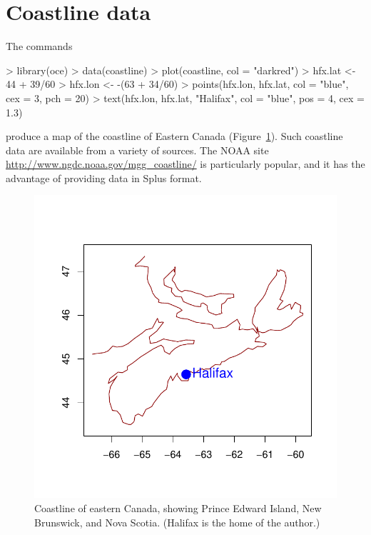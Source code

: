 \documentclass{article}
\begin{document}
\section{Coastline data}
The commands
\begin{Schunk}
\begin{Sinput}
> library(oce)
> data(coastline)
> plot(coastline, col = "darkred")
> hfx.lat <- 44 + 39/60
> hfx.lon <- -(63 + 34/60)
> points(hfx.lon, hfx.lat, col = "blue", cex = 3, pch = 20)
> text(hfx.lon, hfx.lat, "Halifax", col = "blue", pos = 4, cex = 1.3)
\end{Sinput}
\end{Schunk}
produce a map of the coastline of Eastern Canada (Figure~\ref{fig:coastline}). Such coastline
data are available from a variety of sources. The NOAA site
\url{http://www.ngdc.noaa.gov/mgg_coastline/}
is particularly popular, and it has the advantage
of providing data in Splus format.
\begin{figure}
\begin{center}
\includegraphics{oce-coastlinefig}
\end{center}
\caption{Coastline of eastern Canada, showing Prince Edward Island, New Brunswick, and Nova Scotia.  (Halifax is the home of the author.)}
\label{fig:coastline}
\end{figure}
\end{document}
